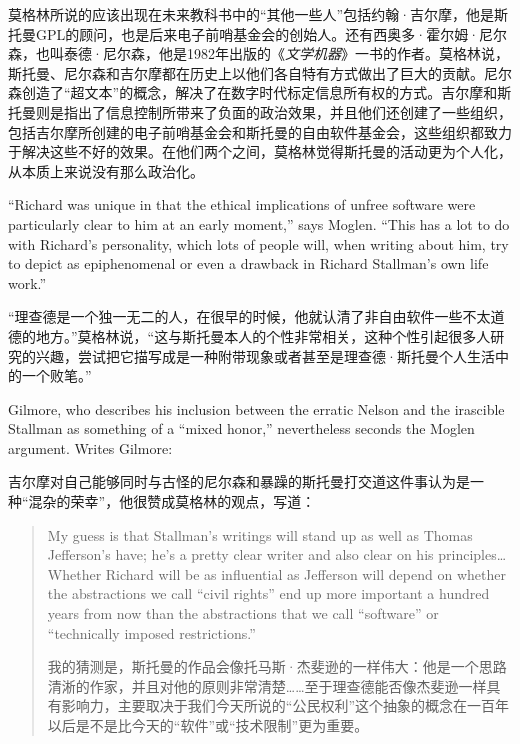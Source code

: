 \ifdefined\chs
莫格林所说的应该出现在未来教科书中的``其他一些人''包括约翰·吉尔摩，他是斯托曼GPL的顾问，也是后来电子前哨基金会的创始人。还有西奥多·霍尔姆·尼尔森，也叫泰德·尼尔森，他是1982年出版的《\textit{文学机器}》一书的作者。莫格林说，斯托曼、尼尔森和吉尔摩都在历史上以他们各自特有方式做出了巨大的贡献。尼尔森创造了``超文本''的概念，解决了在数字时代标定信息所有权的方式。吉尔摩和斯托曼则是指出了信息控制所带来了负面的政治效果，并且他们还创建了一些组织，包括吉尔摩所创建的电子前哨基金会和斯托曼的自由软件基金会，这些组织都致力于解决这些不好的效果。在他们两个之间，莫格林觉得斯托曼的活动更为个人化，从本质上来说没有那么政治化。
\fi

\ifdefined\eng
``Richard was unique in that the ethical implications of unfree software were particularly clear to him at an early moment,'' says Moglen. ``This has a lot to do with Richard's personality, which lots of people will, when writing about him, try to depict as epiphenomenal or even a drawback in Richard Stallman's own life work.''
\fi

\ifdefined\chs
``理查德是一个独一无二的人，在很早的时候，他就认清了非自由软件一些不太道德的地方。''莫格林说，``这与斯托曼本人的个性非常相关，这种个性引起很多人研究的兴趣，尝试把它描写成是一种附带现象或者甚至是理查德·斯托曼个人生活中的一个败笔。''
\fi

\ifdefined\eng
Gilmore, who describes his inclusion between the erratic Nelson and the irascible Stallman as something of a ``mixed honor,'' nevertheless seconds the Moglen argument. Writes Gilmore:
\fi

\ifdefined\chs
吉尔摩对自己能够同时与古怪的尼尔森和暴躁的斯托曼打交道这件事认为是一种``混杂的荣幸''，他很赞成莫格林的观点，写道：
\fi

\begin{quote}
\ifdefined\eng
My guess is that Stallman's writings will stand up as well as Thomas Jefferson's have; he's a pretty clear writer and also clear on his principles\ldots Whether Richard will be as influential as Jefferson will depend on whether the abstractions we call ``civil rights'' end up more important a hundred years from now than the abstractions that we call ``software'' or ``technically imposed restrictions.''
\fi

\ifdefined\chs
我的猜测是，斯托曼的作品会像托马斯·杰斐逊的一样伟大：他是一个思路清淅的作家，并且对他的原则非常清楚……至于理查德能否像杰斐逊一样具有影响力，主要取决于我们今天所说的``公民权利''这个抽象的概念在一百年以后是不是比今天的``软件''或``技术限制''更为重要。
\fi
\end{quote}

